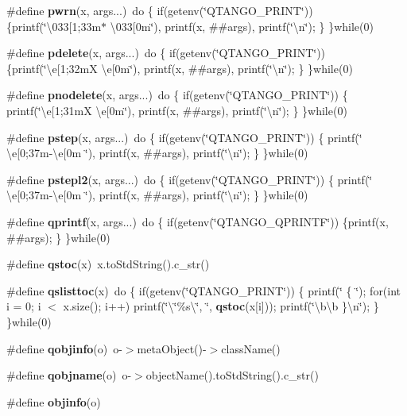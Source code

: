 \begin{DoxyCompactItemize}
\item 
\#define {\bf pwrn}(x,  args...)~do \{ if(getenv(\char`\"{}Q\+T\+A\+N\+G\+O\+\_\+\+P\+R\+I\+NT\char`\"{})) \{printf(\char`\"{}\textbackslash{}033[1;33m$\ast$ \textbackslash{}033[0m\char`\"{}), printf(x, \#\#args), printf(\char`\"{}\textbackslash{}n\char`\"{}); \} \}while(0)
\item 
\#define {\bf pdelete}(x,  args...)~do \{   if(getenv(\char`\"{}Q\+T\+A\+N\+G\+O\+\_\+\+P\+R\+I\+NT\char`\"{})) \{printf(\char`\"{}\textbackslash{}e[1;32m\+X \textbackslash{}e[0m\char`\"{}), printf(x, \#\#args), printf(\char`\"{}\textbackslash{}n\char`\"{}); \} \}while(0)
\item 
\#define {\bf pnodelete}(x,  args...)~do \{ if(getenv(\char`\"{}Q\+T\+A\+N\+G\+O\+\_\+\+P\+R\+I\+NT\char`\"{})) \{ printf(\char`\"{}\textbackslash{}e[1;31m\+X \textbackslash{}e[0m\char`\"{}), printf(x, \#\#args), printf(\char`\"{}\textbackslash{}n\char`\"{}); \} \}while(0)
\item 
\#define {\bf pstep}(x,  args...)~do \{ if(getenv(\char`\"{}Q\+T\+A\+N\+G\+O\+\_\+\+P\+R\+I\+NT\char`\"{})) \{ printf(\char`\"{}   \textbackslash{}e[0;37m-\/\textbackslash{}e[0m \char`\"{}), printf(x, \#\#args), printf(\char`\"{}\textbackslash{}n\char`\"{}); \} \}while(0)
\item 
\#define {\bf pstepl2}(x,  args...)~do \{  if(getenv(\char`\"{}Q\+T\+A\+N\+G\+O\+\_\+\+P\+R\+I\+NT\char`\"{})) \{ printf(\char`\"{}    \textbackslash{}e[0;37m-\/\textbackslash{}e[0m \char`\"{}), printf(x, \#\#args), printf(\char`\"{}\textbackslash{}n\char`\"{}); \} \}while(0)
\item 
\#define {\bf qprintf}(x,  args...)~do  \{  if(getenv(\char`\"{}Q\+T\+A\+N\+G\+O\+\_\+\+Q\+P\+R\+I\+N\+TF\char`\"{})) \{printf(x, \#\#args); \} \}while(0)
\item 
\#define {\bf qstoc}(x)~x.\+to\+Std\+String().c\+\_\+str()
\item 
\#define {\bf qslisttoc}(x)~do \{ if(getenv(\char`\"{}Q\+T\+A\+N\+G\+O\+\_\+\+P\+R\+I\+NT\char`\"{})) \{ printf(\char`\"{}  \{ \char`\"{}); for(int i = 0; i $<$ x.\+size(); i++) printf(\char`\"{}\textbackslash{}\char`\"{}\%s\textbackslash{}\char`\"{}, \char`\"{}, {\bf qstoc}(x[i])); printf(\char`\"{}\textbackslash{}b\textbackslash{}b \}\textbackslash{}n\char`\"{}); \} \}while(0)
\item 
\#define {\bf qobjinfo}(o)~o-\/$>$meta\+Object()-\/$>$class\+Name()
\item 
\#define {\bf qobjname}(o)~o-\/$>$object\+Name().to\+Std\+String().c\+\_\+str()
\item 
\#define {\bf objinfo}(o)
\end{DoxyCompactItemize}


